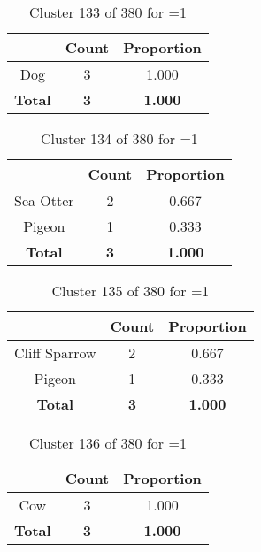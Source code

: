 \begin{table}[ht!]
\centering
\begin{tabular}{|c|c|c|}
\hline
\bf \Spec{} &\bf Count &\bf Proportion\\ \hline \hline
Dog & 3 & 1.000\\ \hline
\hline
\bf Total & \bf 3 & \bf 1.000\\ \hline
\end{tabular}
\label{tab:cluster:133:1}
\caption{Cluster 133 of 380 for \minneigh{}=1}
\end{table}

\begin{table}[ht!]
\centering
\begin{tabular}{|c|c|c|}
\hline
\bf \Spec{} &\bf Count &\bf Proportion\\ \hline \hline
Sea Otter & 2 & 0.667\\ \hline
Pigeon & 1 & 0.333\\ \hline
\hline
\bf Total & \bf 3 & \bf 1.000\\ \hline
\end{tabular}
\label{tab:cluster:134:1}
\caption{Cluster 134 of 380 for \minneigh{}=1}
\end{table}

\begin{table}[ht!]
\centering
\begin{tabular}{|c|c|c|}
\hline
\bf \Spec{} &\bf Count &\bf Proportion\\ \hline \hline
Cliff Sparrow & 2 & 0.667\\ \hline
Pigeon & 1 & 0.333\\ \hline
\hline
\bf Total & \bf 3 & \bf 1.000\\ \hline
\end{tabular}
\label{tab:cluster:135:1}
\caption{Cluster 135 of 380 for \minneigh{}=1}
\end{table}

\begin{table}[ht!]
\centering
\begin{tabular}{|c|c|c|}
\hline
\bf \Spec{} &\bf Count &\bf Proportion\\ \hline \hline
Cow & 3 & 1.000\\ \hline
\hline
\bf Total & \bf 3 & \bf 1.000\\ \hline
\end{tabular}
\label{tab:cluster:136:1}
\caption{Cluster 136 of 380 for \minneigh{}=1}
\end{table}

